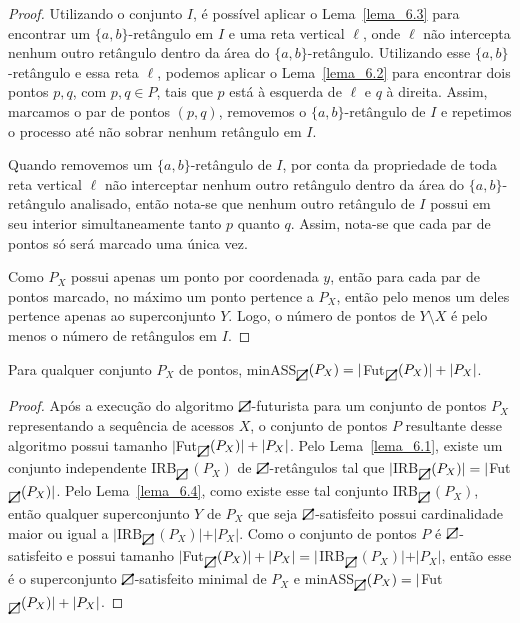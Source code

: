 \begin{proof}
    Utilizando o conjunto $I$, é possível aplicar o Lema~\ref{lema_6.3} para encontrar um $\{a,b\}$-retângulo em $I$ e uma reta vertical $\ell$, onde $\ell$ não intercepta nenhum outro retângulo dentro da área do $\{a,b\}$-retângulo. Utilizando esse $\{a,b\}$-retângulo e essa reta $\ell$, podemos aplicar o Lema~\ref{lema_6.2} para encontrar dois pontos $p,q$, com $p,q \in P$, tais que $p$ está à esquerda de $\ell$ e $q$ à direita. Assim, marcamos o par de pontos $(p,q)$, removemos o $\{a,b\}$-retângulo de $I$ e repetimos o processo até não sobrar nenhum retângulo em $I$.

    Quando removemos um $\{a,b\}$-retângulo de $I$, por conta da propriedade de toda reta vertical $\ell$ não interceptar nenhum outro retângulo dentro da área do $\{a,b\}$-retângulo analisado, então nota-se que nenhum outro retângulo de $I$ possui em seu interior simultaneamente tanto $p$ quanto $q$. Assim, nota-se que cada par de pontos só será marcado uma única vez.

    Como $P_X$ possui apenas um ponto por coordenada $y$, então para cada par de pontos marcado, no máximo um ponto pertence a $P_X$, então pelo menos um deles pertence apenas ao superconjunto $Y$. Logo, o número de pontos de $Y \setminus X$ é pelo menos o número de retângulos em $I$. 
\end{proof}

\begin{lemma}\label{lema_minASS_para_Fut}
    Para qualquer conjunto $P_X$ de pontos, minASS$_{\rectpos}(P_X) = |$Fut$_{\rectpos}(P_X)| + |P_X|$.
\end{lemma}

\begin{proof}
    Após a execução do algoritmo $\rectpos$-futurista para um conjunto de pontos $P_X$ representando a sequência de acessos $X$, o conjunto de pontos $P$ resultante desse algoritmo possui tamanho $|$Fut$_{\rectpos}(P_X)| + |P_X|$. Pelo Lema~\ref{lema_6.1}, existe um conjunto independente IRB$_{\rectpos}$$(P_X)$ de $\rectpos$-retângulos tal que $|$IRB$_{\rectpos}(P_X)| = |$Fut$_{\rectpos}(P_X)|$. Pelo Lema~\ref{lema_6.4}, como existe esse tal conjunto IRB$_{\rectpos}$$(P_X)$, então qualquer superconjunto $Y$ de $P_X$ que seja $\rectpos$-satisfeito possui cardinalidade maior ou igual a $|$IRB$_{\rectpos}$$(P_X)| + |P_X|$. Como o conjunto de pontos $P$ é $\rectpos$-satisfeito e possui tamanho $|$Fut$_{\rectpos}(P_X)| + |P_X| = |$IRB$_{\rectpos}$$(P_X)| + |P_X|$, então esse é o superconjunto $\rectpos$-satisfeito minimal de $P_X$ e minASS$_{\rectpos}(P_X) = |$Fut$_{\rectpos}(P_X)| + |P_X|$.
\end{proof}

